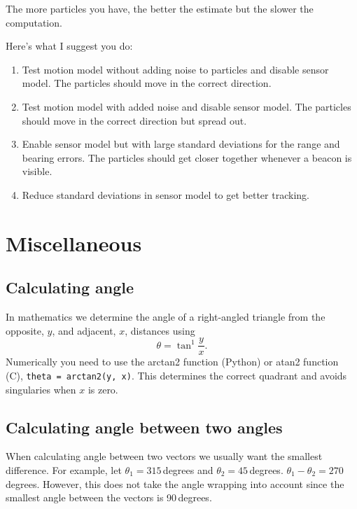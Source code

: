 \documentclass[a4paper, 12pt]{article}
\newcommand{\code}[1]{\texttt{#1}}
\begin{document}
The more particles you have, the better the estimate but the slower
the computation.

Here's what I suggest you do:

\begin{enumerate}
\item Test motion model without adding noise to particles and disable
  sensor model.  The particles should move in the correct direction.

\item Test motion model with added noise and disable sensor model.
  The particles should move in the correct direction but spread out.

\item Enable sensor model but with large standard deviations for the
  range and bearing errors.  The particles should get closer together
  whenever a beacon is visible.

\item Reduce standard deviations in sensor model to get better
  tracking.
\end{enumerate}


\section{Miscellaneous}

\subsection{Calculating angle}

In mathematics we determine the angle of a right-angled triangle from
the opposite, $y$, and adjacent, $x$, distances using
%
\begin{equation}
  \theta = \tan^{1} \frac{y}{x}.
\end{equation}
%
Numerically you need to use the arctan2 function (Python) or atan2
function (C), \code{theta = arctan2(y, x)}.  This determines the
correct quadrant and avoids singularies when $x$ is zero.


\subsection{Calculating angle between two angles}


When calculating angle between two vectors we usually want the
smallest difference.  For example, let $\theta_1 = 315$\,degrees and
$\theta_2 = 45$\,degrees.  $\theta_1 - \theta_2 = 270$\,degrees.
However, this does not take the angle wrapping into account since the
smallest angle between the vectors is 90\,degrees.
\end{document}
